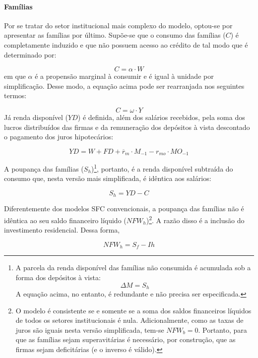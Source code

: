 \paragraph*{Famílias} 
Por se tratar do setor institucional mais complexo do modelo, optou-se por apresentar as famílias por último. Supõe-se que o consumo das famílias ($C$) é completamente induzido e que não possuem acesso ao crédito de tal modo que é determinado por:

\begin{equation}
\label{_C}
    C = \alpha\cdot W
\end{equation}
em que $\alpha$ é a propensão marginal à consumir e é igual à unidade por simplificação. Desse modo, a equação acima pode ser rearranjada nos seguintes termos:

$$
C = \omega\cdot Y
$$
Já renda disponível ($YD$) é definida, além dos salários recebidos, pela soma dos lucros distribuídos das firmas e da remuneração dos depósitos à vista descontado o pagamento dos juros hipotecários:

\begin{equation}
    \label{EqYD}
    YD = W + FD + \overline r_m\cdot M_{-1} - r_{mo}\cdot MO_{-1}
\end{equation}

A poupança das famílias ($S_h$)\footnote{
A parcela da renda disponível das famílias não consumida é acumulada sob a forma dos depósitos à vista:
$$
\Delta M = S_h
$$
A equação acima, no entanto, é redundante e não precisa ser especificada.}, portanto, é a renda disponível subtraída do consumo que, nesta versão mais simplificada, é idêntica aos salários:

\begin{equation}
    \label{EqSh}
    S_h = YD - C
\end{equation}

Diferentemente dos modelos SFC convencionais, a poupança das famílias não é idêntica ao seu saldo financeiro líquido ($NFW_h$)\footnote{O modelo é consistente se e somente se a soma dos saldos financeiros líquidos de todos os setores institucionais é nula. Adicionalmente, como as taxas de juros são iguais nesta versão simplificada, tem-se $NFW_b = 0$. Portanto, para que as famílias sejam superavitárias é necessário, por construção, que as firmas sejam deficitárias (e o inverso é válido).
}. A razão disso é a inclusão do investimento residencial. Dessa forma, 

\begin{equation}
\label{NFWh}
    NFW_h = S_f - Ih
\end{equation}

